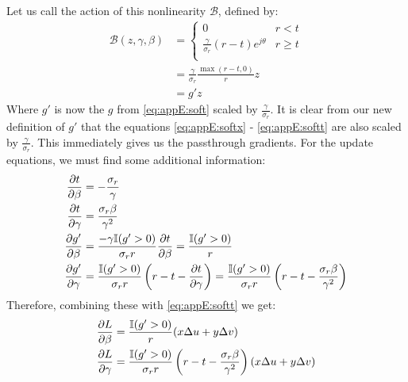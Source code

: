 Let us call the action of this nonlinearity $\mathcal{B}$, defined by:
\begin{align}
  \mathcal{B}(z, \gamma, \beta) &= \left\{ \begin{array}{ll}
      0 & r < t \\
      \frac{\gamma}{\sigma_r}(r-t)e^{j\theta} & r \geq t\\
  \end{array} 
\right. \\
&= \frac{\gamma}{\sigma_r} \frac{\max(r-t, 0)}{r} z \\
&= g'z
\end{align}
Where $g'$ is now the $g$ from \eqref{eq:appE:soft} scaled by $\frac{\gamma}{\sigma_r}$.
It is clear from our new definition of $g'$ 
that the equations \eqref{eq:appE:softx} - \eqref{eq:appE:softt} are also scaled
by $\frac{\gamma}{\sigma_r}$. 
This immediately gives us the passthrough gradients. For the update equations,
we must find some additional information:
\begin{align}
  \frac{\partial t}{\partial \beta} &= -\frac{\sigma_r}{\gamma} \\
  \frac{\partial t}{\partial \gamma} &= \frac{\sigma_r \beta}{\gamma^2} \\
  \frac{\partial g'}{\partial \beta} &= \frac{-\gamma \mathbb{I}(g' > 0)}{\sigma_r r} \frac{\partial t}{\partial \beta} = \frac{\mathbb{I}(g' > 0)}{r}  \\
  \frac{\partial g'}{\partial \gamma} &= \frac{\mathbb{I}(g' > 0)}{\sigma_r r}\left(r - t -\frac{\partial t}{\partial \gamma}\right) = 
      \frac{\mathbb{I}(g' > 0)}{\sigma_r r}\left(r - t - \frac{\sigma_r \beta}{\gamma^2}
      \right)  
\end{align}
Therefore, combining these with \eqref{eq:appE:softt} we get:
\begin{align}
  \frac{\partial L}{\partial \beta} &= \frac{\mathbb{I}(g' > 0)}{r} (x\Delta u + y\Delta v) \\
  \frac{\partial L}{\partial \gamma} &= \frac{\mathbb{I}(g' > 0)}{\sigma_r r}\left(r - t - \frac{\sigma_r \beta}{\gamma^2}\right)(x\Delta u + y\Delta v) 
\end{align}


